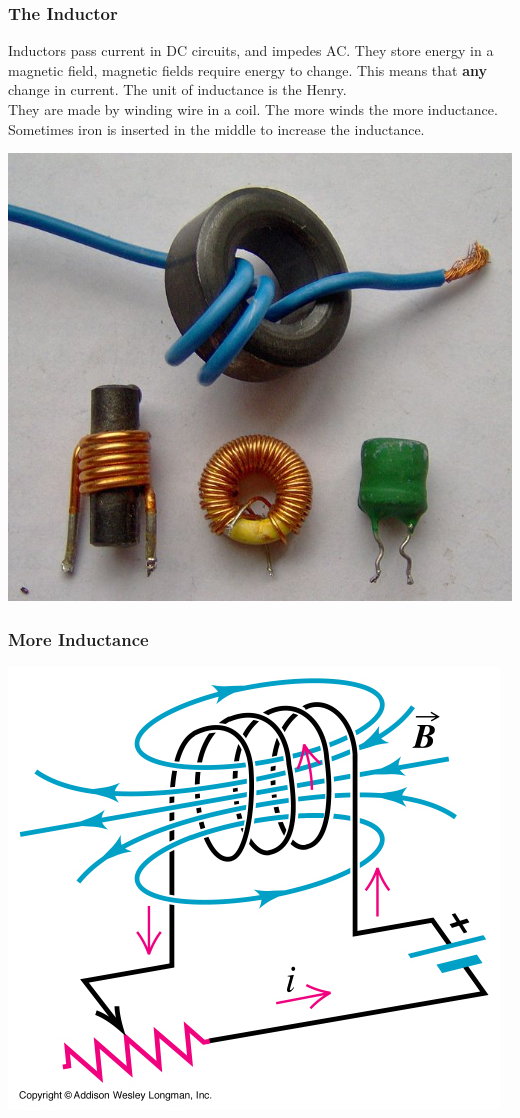\documentclass[10pt, handout]{beamer}
\begin{document}
\begin{frame}
\frametitle{The Inductor}
Inductors pass current in DC circuits, and impedes AC. They store energy in a magnetic field, magnetic fields require energy to change. This means that \textbf{any} change in current. The unit of inductance is the Henry.\\
They are made by winding wire in a coil. The more winds the more inductance. Sometimes iron is inserted in the middle to increase the inductance.
\begin{center}
\includegraphics[height=.4\textheight]{inductor.jpg}
\end{center}

\end{frame}

\begin{frame}
\frametitle{More Inductance}
\begin{center}
\includegraphics[height=.9\textheight]{inductor.png}
\end{center}
\end{frame}
\end{document}
